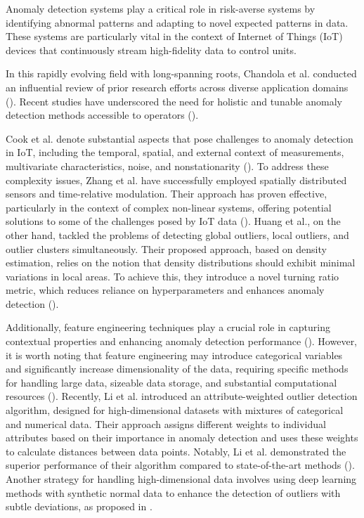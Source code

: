 Anomaly detection systems play a critical role in risk-averse systems by identifying abnormal patterns and adapting to novel expected patterns in data. These systems are particularly vital in the context of Internet of Things (IoT) devices that continuously stream high-fidelity data to control units.

In this rapidly evolving field with long-spanning roots, Chandola et al. conducted an influential review of prior research efforts across diverse application domains (\cite{Chandola2009}).
Recent studies have underscored the need for holistic and tunable anomaly detection methods accessible to operators (\cite{Laptev2015, Kejariwal2015, Cook2020}).

Cook et al. denote substantial aspects that pose challenges to anomaly detection in IoT, including the temporal, spatial, and external context of measurements, multivariate characteristics, noise, and nonstationarity (\cite{Cook2020}). To address these complexity issues, Zhang et al. have successfully employed spatially distributed sensors and time-relative modulation. Their approach has proven effective, particularly in the context of complex non-linear systems, offering potential solutions to some of the challenges posed by IoT data (\cite{ZHANG2024121506}). Huang et al., on the other hand, tackled the problems of detecting global outliers, local outliers, and outlier clusters simultaneously. Their proposed approach, based on density estimation, relies on the notion that density distributions should exhibit minimal variations in local areas. To achieve this, they introduce a novel turning ratio metric, which reduces reliance on hyperparameters and enhances anomaly detection (\cite{HUANG2023120799}).

Additionally, feature engineering techniques play a crucial role in capturing contextual properties and enhancing anomaly detection performance (\cite{Fan2019}). However, it is worth noting that feature engineering may introduce categorical variables and significantly increase dimensionality of the data, requiring specific methods for handling large data, sizeable data storage, and substantial computational resources (\cite{Talagala2021}). Recently, Li et al. introduced an attribute-weighted outlier detection algorithm, designed for high-dimensional datasets with mixtures of categorical and numerical data. Their approach assigns different weights to individual attributes based on their importance in anomaly detection and uses these weights to calculate distances between data points. Notably, Li et al. demonstrated the superior performance of their algorithm compared to state-of-the-art methods (\cite{LI2024121304}). Another strategy for handling high-dimensional data involves using deep learning methods with synthetic normal data to enhance the detection of outliers with subtle deviations, as proposed in \cite{DU2024121161}.

